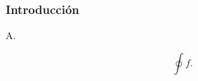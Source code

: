 



\begin{frame}
	\frametitle{Introducción}
	A.

	\begin{equation*}
		\oint f.
	\end{equation*}
\end{frame}

%

